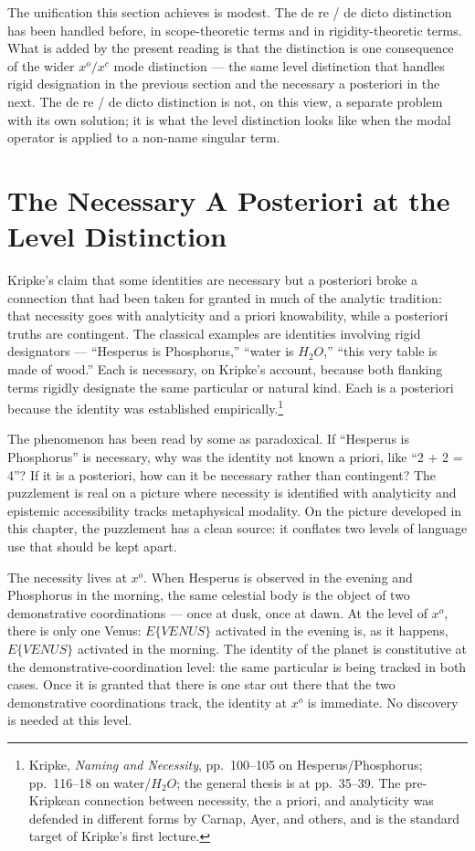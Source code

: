 \documentclass[10pt]{article}
\begin{document}
The unification this section achieves is modest. The de re / de dicto distinction has been handled before, in scope-theoretic terms and in rigidity-theoretic terms. What is added by the present reading is that the distinction is one consequence of the wider \(x^o/x^c\) mode distinction --- the same level distinction that handles rigid designation in the previous section and the necessary a posteriori in the next. The de re / de dicto distinction is not, on this view, a separate problem with its own solution; it is what the level distinction looks like when the modal operator is applied to a non-name singular term.

\section{The Necessary A Posteriori at the Level Distinction}\label{the-necessary-a-posteriori-at-the-level-distinction}

Kripke's claim that some identities are necessary but a posteriori broke a connection that had been taken for granted in much of the analytic tradition: that necessity goes with analyticity and a priori knowability, while a posteriori truths are contingent. The classical examples are identities involving rigid designators --- ``Hesperus is Phosphorus,'' ``water is \(H_2O\),'' ``this very table is made of wood.'' Each is necessary, on Kripke's account, because both flanking terms rigidly designate the same particular or natural kind. Each is a posteriori because the identity was established empirically.\footnote{Kripke, \emph{Naming and Necessity}, pp.~100--105 on Hesperus/Phosphorus; pp.~116--18 on water/\(H_2O\); the general thesis is at pp.~35--39. The pre-Kripkean connection between necessity, the a priori, and analyticity was defended in different forms by Carnap, Ayer, and others, and is the standard target of Kripke's first lecture.}

The phenomenon has been read by some as paradoxical. If ``Hesperus is Phosphorus'' is necessary, why was the identity not known a priori, like ``2 + 2 = 4''? If it is a posteriori, how can it be necessary rather than contingent? The puzzlement is real on a picture where necessity is identified with analyticity and epistemic accessibility tracks metaphysical modality. On the picture developed in this chapter, the puzzlement has a clean source: it conflates two levels of language use that should be kept apart.

The necessity lives at \(x^o\). When Hesperus is observed in the evening and Phosphorus in the morning, the same celestial body is the object of two demonstrative coordinations --- once at dusk, once at dawn. At the level of \(x^o\), there is only one Venus: \(E\{VENUS\}\) activated in the evening is, as it happens, \(E\{VENUS\}\) activated in the morning. The identity of the planet is constitutive at the demonstrative-coordination level: the same particular is being tracked in both cases. Once it is granted that there is one star out there that the two demonstrative coordinations track, the identity at \(x^o\) is immediate. No discovery is needed at this level.
\end{document}
